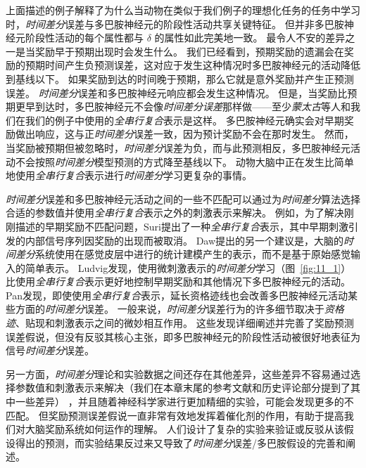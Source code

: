 上面描述的例子解释了为什么当动物在类似于我们例子的理想化任务的任务中学习时，\textit{时间差分}误差与多巴胺神经元的阶段性活动共享关键特征。
但并非多巴胺神经元阶段性活动的每个属性都与 $\delta$ 的属性如此完美地一致。
最令人不安的差异之一是当奖励早于预期出现时会发生什么。
我们已经看到，预期奖励的遗漏会在奖励的预期时间产生负预测误差，这对应于发生这种情况时多巴胺神经元的活动降低到基线以下。
如果奖励到达的时间晚于预期，那么它就是意外奖励并产生正预测误差。
\textit{时间差分}误差和多巴胺神经元响应都会发生这种情况。
但是，当奖励比预期更早到达时，多巴胺神经元不会像\textit{时间差分误差}那样做——至少\textit{蒙太古}等人\cite{montague1996framework}和我们在我们的例子中使用的\textit{全串行复合}表示是这样。
多巴胺神经元确实会对早期奖励做出响应，这与正\textit{时间差分}误差一致，因为预计奖励不会在那时发生。
然而，当奖励被预期但被忽略时，\textit{时间差分}误差为负，而与此预测相反，多巴胺神经元活动不会按照\textit{时间差分}模型预测的方式降至基线以下\cite{hollerman1998dopamine}。
动物大脑中正在发生比简单地使用\textit{全串行复合}表示进行\textit{时间差分}学习更复杂的事情。



\textit{时间差分}误差和多巴胺神经元活动之间的一些不匹配可以通过为\textit{时间差分}算法选择合适的参数值并使用\textit{全串行复合}表示之外的刺激表示来解决。
例如，为了解决刚刚描述的早期奖励不匹配问题，Suri\cite{suri1999neural}提出了一种\textit{全串行复合}表示，其中早期刺激引发的内部信号序列因奖励的出现而被取消。
Daw\cite{daw2006representation}提出的另一个建议是，大脑的\textit{时间差分}系统使用在感觉皮层中进行的统计建模产生的表示，而不是基于原始感觉输入的简单表示。
Ludvig\cite{ludvig2008stimulus}发现，使用微刺激表示的\textit{时间差分}学习（图~\ref{fig:11_1}）比使用\textit{全串行复合}表示更好地控制早期奖励和其他情况下多巴胺神经元的活动。
Pan\cite{pan2005dopamine}发现，即使使用\textit{全串行复合}表示，延长资格迹线也会改善多巴胺神经元活动某些方面的\textit{时间差分}误差。
一般来说，\textit{时间差分}误差行为的许多细节取决于\textit{资格迹}、贴现和刺激表示之间的微妙相互作用。
这些发现详细阐述并完善了奖励预测误差假说，但没有反驳其核心主张，即多巴胺神经元的阶段性活动被很好地表征为信号\textit{时间差分}误差。


另一方面，\textit{时间差分}理论和实验数据之间还存在其他差异，这些差异不容易通过选择参数值和刺激表示来解决（我们在本章末尾的参考文献和历史评论部分提到了其中一些差异） ，并且随着神经科学家进行更加精细的实验，可能会发现更多的不匹配。
但奖励预测误差假说一直非常有效地发挥着催化剂的作用，有助于提高我们对大脑奖励系统如何运作的理解。
人们设计了复杂的实验来验证或反驳从该假设得出的预测，而实验结果反过来又导致了\textit{时间差分}误差/多巴胺假设的完善和阐述。


